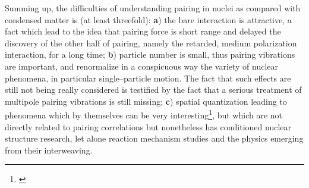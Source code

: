\begin{subappendices}
    Summing up, the difficulties of understanding pairing in nuclei as compared with condensed matter is (at least threefold): \textbf{a}) the bare interaction is attractive, a fact which lead to the idea that pairing force is short range and delayed the discovery of the other half of pairing, namely the retarded, medium polarization interaction, for a long time; \textbf{b}) particle number is small, thus pairing vibrations are important, and renormalize in a conspicuous way the variety of nuclear phenomena, in particular single--particle motion. The fact that such effects are still not being really considered is testified by the fact that a serious treatment of multipole pairing vibrations is still missing; \textbf{c}) spatial quantization leading to phenomena which by themselves can be very interesting\footnote{\cite{Bertsch:67,Ferreira:84,Lotti:89,Matsuo:06,Matsuo:13}}, but which are not directly related to pairing correlations but nonetheless has conditioned nuclear structure research, let alone reaction mechanism studies and the physics emerging from their interweaving.

\end{subappendices}
